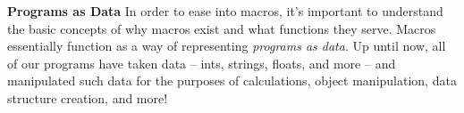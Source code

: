 \textbf{Programs as Data} 
In order to ease into macros, it's important to understand the basic concepts of why macros exist and what functions they serve.
Macros essentially function as a way of representing \textit{programs as data}.
Up until now, all of our programs have taken data -- ints, strings, floats, and more -- and manipulated such data for the purposes of calculations, object manipulation, data structure creation, and more!